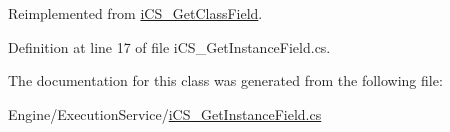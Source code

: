 Reimplemented from \hyperlink{classi_c_s___get_class_field_aebb57983ea1b5fd5f3d1ae56044c82ea}{i\+C\+S\+\_\+\+Get\+Class\+Field}.



Definition at line 17 of file i\+C\+S\+\_\+\+Get\+Instance\+Field.\+cs.



The documentation for this class was generated from the following file\+:\begin{DoxyCompactItemize}
\item 
Engine/\+Execution\+Service/\hyperlink{i_c_s___get_instance_field_8cs}{i\+C\+S\+\_\+\+Get\+Instance\+Field.\+cs}\end{DoxyCompactItemize}
